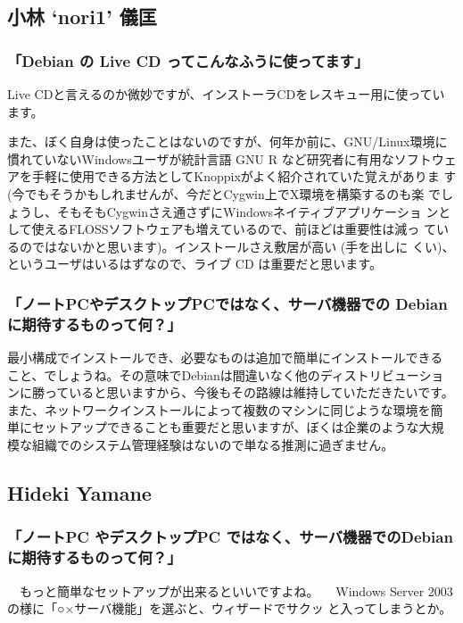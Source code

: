 \documentclass[mingoth,a4paper]{jsarticle}
\begin{document}
\subsection{小林 `nori1' 儀匡}

\subsubsection{「Debian の Live CD ってこんなふうに使ってます」}

Live CDと言えるのか微妙ですが、インストーラCDをレスキュー用に使っています。

また、ぼく自身は使ったことはないのですが、何年か前に、GNU/Linux環境に
慣れていないWindowsユーザが統計言語 GNU R など研究者に有用なソフトウェ
アを手軽に使用できる方法としてKnoppixがよく紹介されていた覚えがありま
す (今でもそうかもしれませんが、今だとCygwin上でX環境を構築するのも楽
でしょうし、そもそもCygwinさえ通さずにWindowsネイティブアプリケーショ
ンとして使えるFLOSSソフトウェアも増えているので、前ほどは重要性は減っ
ているのではないかと思います)。インストールさえ敷居が高い (手を出しに
くい)、というユーザはいるはずなので、ライブ CD は重要だと思います。

\subsubsection{「ノートPCやデスクトップPCではなく、サーバ機器での Debian に期待するものって何？」}

最小構成でインストールでき、必要なものは追加で簡単にインストールできる
こと、でしょうね。その意味でDebianは間違いなく他のディストリビューショ
ンに勝っていると思いますから、今後もその路線は維持していただきたいです。
また、ネットワークインストールによって複数のマシンに同じような環境を簡
単にセットアップできることも重要だと思いますが、ぼくは企業のような大規
模な組織でのシステム管理経験はないので単なる推測に過ぎません。


\subsection{Hideki Yamane}

\subsubsection{「ノートPC やデスクトップPC ではなく、サーバ機器でのDebian に期待するものって何？」}
　もっと簡単なセットアップが出来るといいですよね。
　Windows Server 2003 の様に「○×サーバ機能」を選ぶと、ウィザードでサクッ
と入ってしまうとか。
\end{document}
